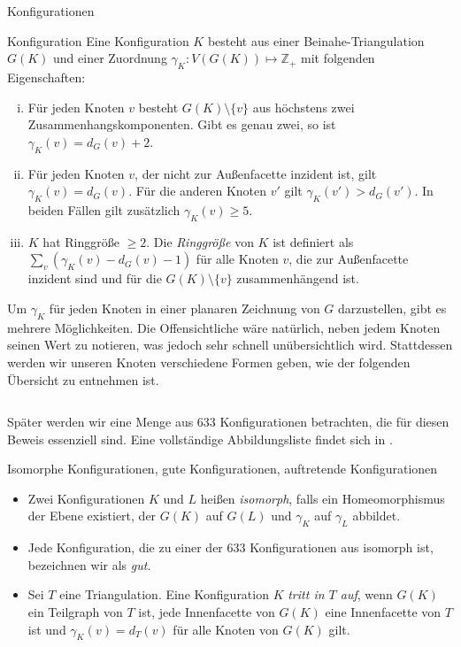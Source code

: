 \begin{section}{Konfigurationen}
 \begin{definition}{Konfiguration}
  Eine Konfiguration $K$ besteht aus einer Beinahe-Triangulation $G(K)$ und einer Zuordnung $\gamma_K : V(G(K)) \mapsto \mathbb{Z}_+$ mit folgenden Eigenschaften:
  \begin{enumerate}[i)]
   \item Für jeden Knoten $v$ besteht $G(K) \setminus \{v\}$ aus höchstens zwei Zusammenhangskomponenten. Gibt es genau zwei, so ist $\gamma_K(v) = d_G(v) + 2$.
   \item Für jeden Knoten $v$, der nicht zur Außenfacette inzident ist, gilt $\gamma_K(v) = d_G(v)$. Für die anderen Knoten $v'$ gilt $\gamma_K(v') > d_G(v')$. In beiden Fällen gilt zusätzlich $\gamma_K(v) \geq 5$.
   \item $K$ hat Ringgröße $\geq 2$. Die \textit{Ringgröße} von $K$ ist definiert als $\sum_v (\gamma_K(v) - d_G(v) - 1)$ für alle Knoten $v$, die zur Außenfacette inzident sind und für die $G(K) \setminus \{v\}$ zusammenhängend ist.
  \end{enumerate}
 \end{definition}
 
 Um $\gamma_K$ für jeden Knoten in einer planaren Zeichnung von $G$ darzustellen, gibt es mehrere Möglichkeiten. Die Offensichtliche wäre natürlich, neben jedem Knoten seinen Wert zu notieren, was jedoch sehr schnell unübersichtlich wird. Stattdessen werden wir unseren Knoten verschiedene Formen geben, wie der folgenden Übersicht zu entnehmen ist.
 
 \[ \]
 
 Später werden wir eine Menge aus 633 Konfigurationen betrachten, die für diesen Beweis essenziell sind. Eine vollständige Abbildungsliste findet sich in \cite[Seite 35]{FourRSST}. 
 
 \begin{definition}{Isomorphe Konfigurationen, gute Konfigurationen, auftretende Konfigurationen}
 \-\ 
  \begin{itemize}
   \item Zwei Konfigurationen $K$ und $L$ heißen \textit{isomorph}, falls ein Homeomorphismus der Ebene existiert, der $G(K)$ auf $G(L)$ und $\gamma_K$ auf $\gamma_L$ abbildet. 
   \item Jede Konfiguration, die zu einer der 633 Konfigurationen aus \cite{FourRSST} isomorph ist, bezeichnen wir als \textit{gut}. 
   \item Sei $T$ eine Triangulation. Eine Konfiguration $K$ \textit{tritt in $T$ auf}, wenn $G(K)$ ein Teilgraph von $T$ ist, jede Innenfacette von $G(K)$ eine Innenfacette von $T$ ist und $\gamma_K(v) = d_T(v)$ für alle Knoten von $G(K)$ gilt.
  \end{itemize}


\end{definition}
\end{section}
